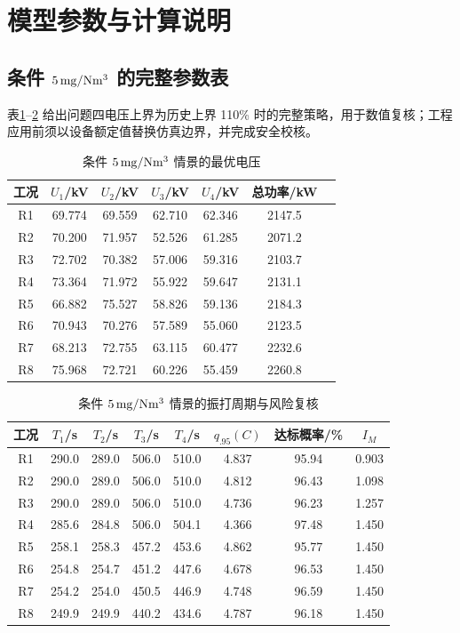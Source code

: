 \section{模型参数与计算说明}

\subsection{条件 \texorpdfstring{$5\,\mathrm{mg/Nm^3}$}{5 mg/Nm3} 的完整参数表}

表\ref{tab:a5u}--\ref{tab:a5t} 给出问题四电压上界为历史上界 110\% 时的完整策略，用于数值复核；工程应用前须以设备额定值替换仿真边界，并完成安全校核。

\begin{table}[H]
\centering
\caption{条件 $5\,\mathrm{mg/Nm^3}$ 情景的最优电压}
\label{tab:a5u}
\begin{tabular}{ccccccc}
\toprule
工况 & $U_1$/kV & $U_2$/kV & $U_3$/kV & $U_4$/kV & 总功率/kW\\
\midrule
R1 & 69.774 & 69.559 & 62.710 & 62.346 & 2147.5\\
R2 & 70.200 & 71.957 & 52.526 & 61.285 & 2071.2\\
R3 & 72.702 & 70.382 & 57.006 & 59.316 & 2103.7\\
R4 & 73.364 & 71.972 & 55.922 & 59.647 & 2131.1\\
R5 & 66.882 & 75.527 & 58.826 & 59.136 & 2184.3\\
R6 & 70.943 & 70.276 & 57.589 & 55.060 & 2123.5\\
R7 & 68.213 & 72.755 & 63.115 & 60.477 & 2232.6\\
R8 & 75.968 & 72.721 & 60.226 & 55.459 & 2260.8\\
\bottomrule
\end{tabular}
\end{table}

\begin{table}[H]
\centering
\caption{条件 $5\,\mathrm{mg/Nm^3}$ 情景的振打周期与风险复核}
\label{tab:a5t}
\begin{tabular}{cccccccc}
\toprule
工况 & $T_1$/s & $T_2$/s & $T_3$/s & $T_4$/s & $q_{.95}(C)$ & 达标概率/\% & $I_M$\\
\midrule
R1 & 290.0 & 289.0 & 506.0 & 510.0 & 4.837 & 95.94 & 0.903\\
R2 & 290.0 & 289.0 & 506.0 & 510.0 & 4.812 & 96.43 & 1.098\\
R3 & 290.0 & 289.0 & 506.0 & 510.0 & 4.736 & 96.23 & 1.257\\
R4 & 285.6 & 284.8 & 506.0 & 504.1 & 4.366 & 97.48 & 1.450\\
R5 & 258.1 & 258.3 & 457.2 & 453.6 & 4.862 & 95.77 & 1.450\\
R6 & 254.8 & 254.7 & 451.2 & 447.6 & 4.678 & 96.53 & 1.450\\
R7 & 254.2 & 254.0 & 450.5 & 446.9 & 4.748 & 96.59 & 1.450\\
R8 & 249.9 & 249.9 & 440.2 & 434.6 & 4.787 & 96.18 & 1.450\\
\bottomrule
\end{tabular}
\end{table}

